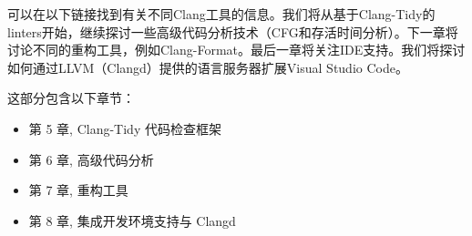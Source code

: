 可以在以下链接找到有关不同Clang工具的信息。我们将从基于Clang-Tidy的linters开始，继续探讨一些高级代码分析技术（CFG和存活时间分析）。下一章将讨论不同的重构工具，例如Clang-Format。最后一章将关注IDE支持。我们将探讨如何通过LLVM（Clangd）提供的语言服务器扩展Visual Studio Code。

这部分包含以下章节：

\begin{itemize}
\item
第 5 章, Clang-Tidy 代码检查框架

\item
第 6 章, 高级代码分析

\item
第 7 章, 重构工具

\item
第 8 章, 集成开发环境支持与 Clangd
\end{itemize}
